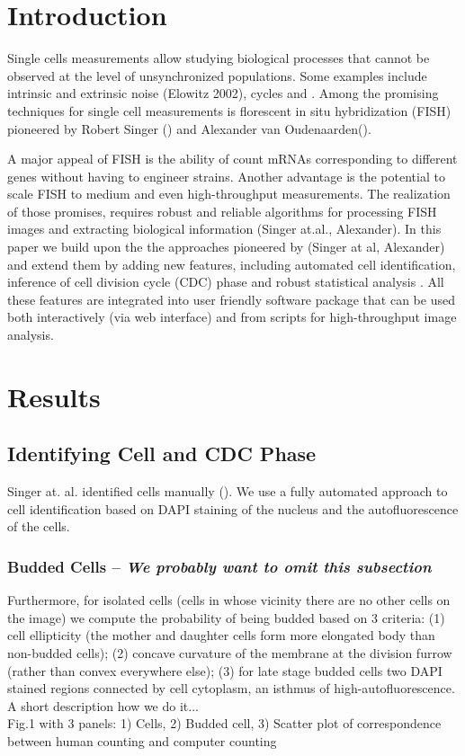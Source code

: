 \documentclass[10pt]{article}
\begin{document}
\begin{spacing}{1.5}
\section*{Introduction}

Single cells measurements allow studying biological processes that cannot be observed at the level of unsynchronized populations. Some examples include intrinsic and extrinsic noise (Elowitz 2002), cycles and . Among the promising techniques for single cell measurements is florescent in situ hybridization (FISH) pioneered by Robert Singer () and Alexander van Oudenaarden(). 

A major appeal of FISH is the ability of count mRNAs corresponding to different genes without having to engineer strains. Another advantage is the potential to scale FISH to medium and even high-throughput measurements. The realization of those promises, requires robust and reliable algorithms for processing FISH images and extracting biological information (Singer at.al., Alexander). In  this paper we build upon the the approaches pioneered by (Singer at al, Alexander) and extend them by adding new features, including automated cell identification, inference of cell division cycle (CDC) phase and robust statistical analysis . All these features are integrated into user friendly software package that can be used both interactively (via web interface) and from scripts for high-throughput image analysis.   




\section*{Results}

\subsection*{Identifying Cell and CDC Phase}
Singer at. al. identified cells manually (). We use a fully automated approach to cell identification based on DAPI staining of the nucleus and the autofluorescence of the cells. \\


\subsubsection*{Budded Cells -- \emph{We probably want to omit this subsection} }
Furthermore, for isolated cells (cells in whose vicinity there are no other cells on the image) we compute the probability of being budded based on $3$ criteria: (1) cell ellipticity (the mother and daughter cells form more elongated body than non-budded cells); (2) concave curvature of the membrane at the division furrow (rather than convex everywhere else); (3) for late stage budded cells two DAPI stained regions connected by cell cytoplasm, an isthmus of high-autofluorescence.            
A short description how we do it...\\
Fig.1 with 3 panels: 1) Cells, 2) Budded cell, 3) Scatter plot of correspondence between human counting and computer counting 


\end{spacing}
\end{document}
